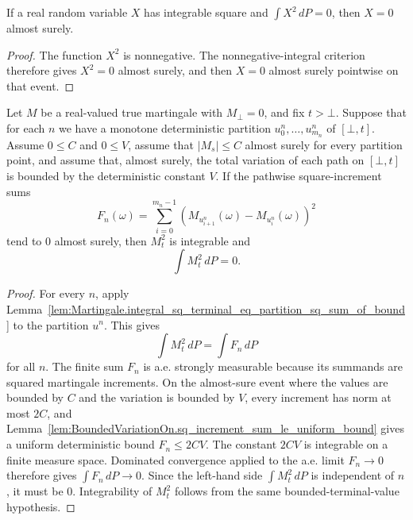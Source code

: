 \begin{lemma}\label{lem:MeasureTheory.ae_eq_zero_of_integral_sq_eq_zero}
If a real random variable \(X\) has integrable square and
\(\int X^2\,dP=0\), then \(X=0\) almost surely.
\end{lemma}

\begin{proof}
The function \(X^2\) is nonnegative.  The nonnegative-integral criterion
therefore gives \(X^2=0\) almost surely, and then \(X=0\) almost surely
pointwise on that event.
\end{proof}

\begin{lemma}\label{lem:Martingale.integral_sq_terminal_eq_zero_of_refining_partitions}
Let \(M\) be a real-valued true martingale with \(M_\bot=0\), and fix
\(t>\bot\).  Suppose that for each \(n\) we have a monotone deterministic
partition \(u^n_0,\ldots,u^n_{m_n}\) of \([\bot,t]\).  Assume \(0\le C\)
and \(0\le V\), assume that \(|M_s|\le C\) almost surely for every partition
point, and assume that, almost surely, the total variation of each path on
\([\bot,t]\) is bounded by the deterministic constant \(V\).  If the
pathwise square-increment sums
\[
  F_n(\omega)=\sum_{i=0}^{m_n-1}
    (M_{u^n_{i+1}}(\omega)-M_{u^n_i}(\omega))^2
\]
tend to \(0\) almost surely, then \(M_t^2\) is integrable and
\[
  \int M_t^2\,dP=0 .
\]
\end{lemma}

\begin{proof}
For every \(n\), apply
Lemma~\ref{lem:Martingale.integral_sq_terminal_eq_partition_sq_sum_of_bound}
to the partition \(u^n\).  This gives
\[
  \int M_t^2\,dP = \int F_n\,dP
\]
for all \(n\).  The finite sum \(F_n\) is a.e. strongly measurable because its
summands are squared martingale increments.  On the almost-sure event where
the values are bounded by \(C\) and the variation is bounded by \(V\), every
increment has norm at most \(2C\), and
Lemma~\ref{lem:BoundedVariationOn.sq_increment_sum_le_uniform_bound} gives a
uniform deterministic bound \(F_n\le 2CV\).  The constant \(2CV\) is integrable
on a finite measure space.  Dominated convergence applied to the a.e. limit
\(F_n\to0\) therefore gives \(\int F_n\,dP\to0\).  Since the left-hand side
\(\int M_t^2\,dP\) is independent of \(n\), it must be \(0\).  Integrability of
\(M_t^2\) follows from the same bounded-terminal-value hypothesis.
\end{proof}

